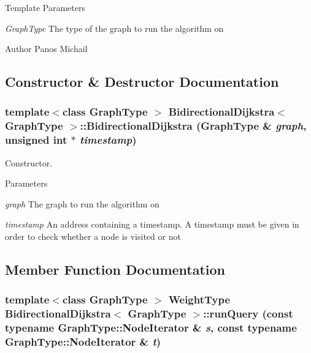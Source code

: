 \begin{DoxyTemplParams}{Template Parameters}
\item[{\em GraphType}]The type of the graph to run the algorithm on \end{DoxyTemplParams}
\begin{DoxyAuthor}{Author}
Panos Michail 
\end{DoxyAuthor}


\subsection{Constructor \& Destructor Documentation}
\hypertarget{class_bidirectional_dijkstra_a7e02bb26961a8e0dae6376f544ba402c}{
\subsubsection[{BidirectionalDijkstra}]{\setlength{\rightskip}{0pt plus 5cm}template$<$class GraphType $>$ {\bf BidirectionalDijkstra}$<$ GraphType $>$::{\bf BidirectionalDijkstra} (GraphType \& {\em graph}, \/  unsigned int $\ast$ {\em timestamp})}}
\label{class_bidirectional_dijkstra_a7e02bb26961a8e0dae6376f544ba402c}


Constructor. 


\begin{DoxyParams}{Parameters}
\item[{\em graph}]The graph to run the algorithm on \item[{\em timestamp}]An address containing a timestamp. A timestamp must be given in order to check whether a node is visited or not \end{DoxyParams}


\subsection{Member Function Documentation}
\hypertarget{class_bidirectional_dijkstra_a4787798df2b6029b3613b238fc684156}{
\subsubsection[{runQuery}]{\setlength{\rightskip}{0pt plus 5cm}template$<$class GraphType $>$ WeightType {\bf BidirectionalDijkstra}$<$ GraphType $>$::runQuery (const typename GraphType::NodeIterator \& {\em s}, \/  const typename GraphType::NodeIterator \& {\em t})}}
\label{class_bidirectional_dijkstra_a4787798df2b6029b3613b238fc684156}


